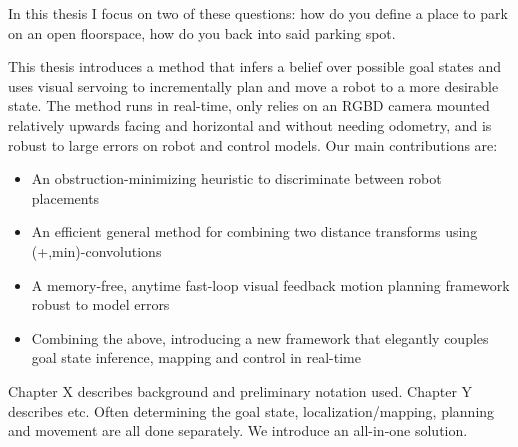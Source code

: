 In this thesis I focus on two of these questions: how do you define a place to
park on an open floorspace, how do you back into said parking spot.

This thesis introduces a method that infers a belief over possible goal states
and uses visual servoing to incrementally plan and move a robot to a more
desirable state. The method runs in real-time, only relies on an RGBD camera
mounted relatively upwards facing and horizontal and without needing odometry,
and is robust to large errors on robot and control models. Our main
contributions are:

\begin{itemize}
\item An obstruction-minimizing heuristic to discriminate
between robot placements
\item An efficient general method for combining two distance transforms using
(+,min)-convolutions
\item A memory-free, anytime fast-loop visual feedback motion planning framework
robust to model errors
\item Combining the above, introducing a new framework that elegantly couples
goal state inference, mapping and control in real-time
\end{itemize}

Chapter X describes background and preliminary notation used. Chapter Y
describes etc.
Often determining the goal state, localization/mapping, planning and movement
are all done separately. We introduce an all-in-one solution.



\endinput
Any text after an \endinput is ignored.

\section{Summary of Thesis}
\subsection{One sentence summary}
We introduce an autonomous back-in parking system for powered wheelchairs
equipped with an RGB-D sensor, that finds a suitable place to park in a room
without any marked parking spots.

\subsection{One paragraph summary}
We address the problem: Where

